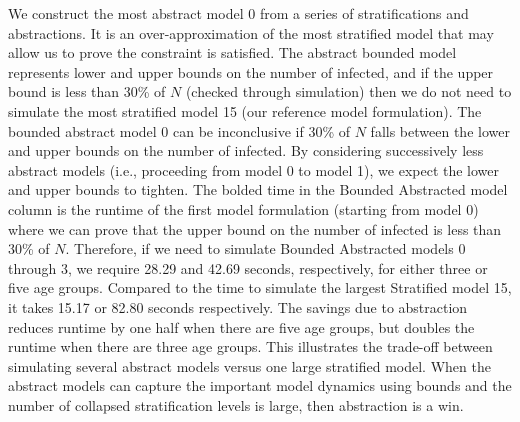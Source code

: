 We construct the most abstract model 0 from a series of stratifications and abstractions.  It is an over-approximation of the most stratified model that may allow us to prove the constraint is satisfied.  The abstract bounded model represents lower and upper bounds on the number of infected, and if the upper bound is less than 30\% of $N$ (checked through simulation) then we do not need to simulate the most stratified model 15 (our reference model formulation).  The bounded abstract model 0 can be inconclusive if 30\% of $N$ falls between the lower and upper bounds on the number of infected.  By considering successively less abstract models (i.e., proceeding from model 0 to model 1), we expect the lower and upper bounds to tighten.  The bolded time in the Bounded Abstracted model column is the runtime of the first model formulation (starting from model 0) where we can prove that the upper bound on the number of infected is less than 30\% of $N$.  Therefore, if we need to simulate Bounded Abstracted models 0 through 3, we require 28.29  and 42.69 seconds, respectively, for either three or five age groups.  Compared to the time to simulate the largest Stratified model 15, it takes 15.17 or 82.80 seconds respectively.  The savings due to abstraction reduces runtime by one half when there are five age groups, but doubles the runtime when there are three age groups.  This illustrates the trade-off between simulating several abstract models versus one large stratified model.  When the abstract models can capture the important model dynamics using bounds and the number of collapsed stratification levels is large, then abstraction is a win.  